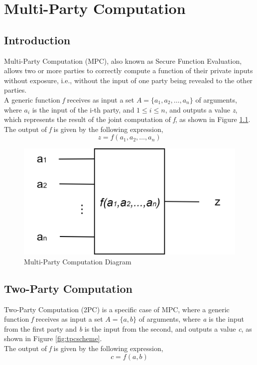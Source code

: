 \chapter{Multi-Party Computation}

\section{Introduction}
Multi-Party Computation (MPC), also known as Secure Function Evaluation, allows two or more parties
to correctly compute a function of their private inputs without exposure, i.e., without
the input of one party being revealed to the other parties.\\
A generic function \textit{f} receives as input a set $A = \{a_1,a_2,\dots,a_n\}$
of arguments, where $a_i$ is the input of the i-th party, and $1\leq i\leq n$, and outputs a value \textit{z}, which represents the result
of the joint computation of \textit{f}, as shown in Figure \ref{fig:mpcscheme}.\\
The output of \textit{f} is given by the following expression,
\begin{equation}\label{eq:mpc}
z = f(a_1,a_2,\dots,a_n)
\end{equation}

\renewcommand{\figurename}{Figure}
\begin{figure}[H]
\centering
\includegraphics[width=.45\linewidth]{./figures/mpc/mpc_scheme}
\caption{Multi-Party Computation Diagram}
\label{fig:mpcscheme}
\end{figure}
\pagebreak

\section{Two-Party Computation}
Two-Party Computation (2PC) is a specific case of MPC, where a generic function \textit{f} receives as input a set $A = \{a,b\}$
of arguments, where \textit{a} is the input from the first party and \textit{b} is the input from the second,
and outputs a value \textit{c}, as shown in Figure \ref{fig:tpcscheme}.\\
The output of \textit{f} is given by the following expression,
\begin{equation}\label{eq:tpc}
c = f(a,b)
\end{equation}

